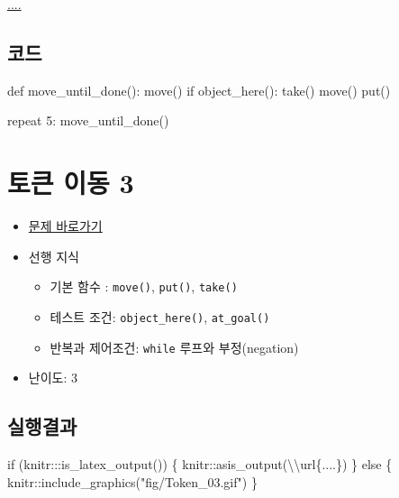 \documentclass[
  b5paperpaper,
  DIV=11,
  numbers=noendperiod]{scrreprt}
\newenvironment{Shaded}{\begin{snugshade}}{\end{snugshade}}
\newcommand{\ControlFlowTok}[1]{\textcolor[rgb]{0.00,0.23,0.31}{#1}}
\newcommand{\DecValTok}[1]{\textcolor[rgb]{0.68,0.00,0.00}{#1}}
\newcommand{\FunctionTok}[1]{\textcolor[rgb]{0.28,0.35,0.67}{#1}}
\newcommand{\KeywordTok}[1]{\textcolor[rgb]{0.00,0.23,0.31}{#1}}
\newcommand{\NormalTok}[1]{\textcolor[rgb]{0.00,0.23,0.31}{#1}}
\newcommand{\SpecialCharTok}[1]{\textcolor[rgb]{0.37,0.37,0.37}{#1}}
\newcommand{\StringTok}[1]{\textcolor[rgb]{0.13,0.47,0.30}{#1}}
\providecommand{\tightlist}{%
  \setlength{\itemsep}{0pt}\setlength{\parskip}{0pt}}\usepackage{longtable,booktabs,array}
\begin{document}
\url{....}

\hypertarget{uxcf54uxb4dc-16}{%
\subsection{코드}\label{uxcf54uxb4dc-16}}

\begin{Shaded}
\begin{Highlighting}[]
\KeywordTok{def}\NormalTok{ move\_until\_done():}
\NormalTok{    move()}
    \ControlFlowTok{if}\NormalTok{ object\_here():}
\NormalTok{        take()}
\NormalTok{        move()}
\NormalTok{        put()}
        
\NormalTok{repeat }\DecValTok{5}\NormalTok{:}
\NormalTok{    move\_until\_done()}
\end{Highlighting}
\end{Shaded}

\hypertarget{token-03}{%
\section{토큰 이동 3}\label{token-03}}

\begin{itemize}
\tightlist
\item
  \href{https://reeborg.ca/reeborg.html?lang=ko-en\&mode=python\&menu=worlds\%2Fmenus\%2Freeborg_intro_en.json\&name=Tokens\%203\&url=worlds\%2Ftutorial_en\%2Ftokens3.json}{문제
  바로가기}
\item
  선행 지식

  \begin{itemize}
  \tightlist
  \item
    기본 함수 : \texttt{move()}, \texttt{put()}, \texttt{take()}
  \item
    테스트 조건: \texttt{object\_here()}, \texttt{at\_goal()}
  \item
    반복과 제어조건: \texttt{while} 루프와 부정(negation)
  \end{itemize}
\item
  난이도: 3
\end{itemize}

\hypertarget{uxc2e4uxd589uxacb0uxacfc-17}{%
\subsection{실행결과}\label{uxc2e4uxd589uxacb0uxacfc-17}}

\begin{Shaded}
\begin{Highlighting}[]
\ControlFlowTok{if}\NormalTok{ (knitr}\SpecialCharTok{:::}\FunctionTok{is\_latex\_output}\NormalTok{()) \{}
\NormalTok{  knitr}\SpecialCharTok{::}\FunctionTok{asis\_output}\NormalTok{(}\StringTok{\textquotesingle{}}\SpecialCharTok{\textbackslash{}\textbackslash{}}\StringTok{url\{....\}\textquotesingle{}}\NormalTok{)}
\NormalTok{\} }\ControlFlowTok{else}\NormalTok{ \{}
\NormalTok{  knitr}\SpecialCharTok{::}\FunctionTok{include\_graphics}\NormalTok{(}\StringTok{"fig/Token\_03.gif"}\NormalTok{)}
\NormalTok{\}}
\end{Highlighting}
\end{Shaded}
\end{document}
